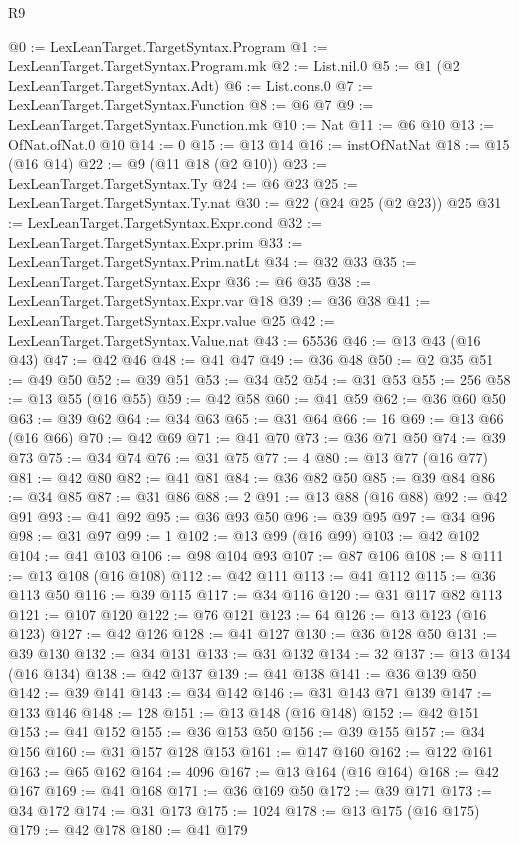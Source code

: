 \begin{lexlean}{R9}
\begin{coremodule}
@0 := LexLeanTarget.TargetSyntax.Program
@1 := LexLeanTarget.TargetSyntax.Program.mk
@2 := List.nil.{0}
@5 := @1 (@2 LexLeanTarget.TargetSyntax.Adt)
@6 := List.cons.{0}
@7 := LexLeanTarget.TargetSyntax.Function
@8 := @6 @7
@9 := LexLeanTarget.TargetSyntax.Function.mk
@10 := Nat
@11 := @6 @10
@13 := OfNat.ofNat.{0} @10
@14 := 0
@15 := @13 @14
@16 := instOfNatNat
@18 := @15 (@16 @14)
@22 := @9 (@11 @18 (@2 @10))
@23 := LexLeanTarget.TargetSyntax.Ty
@24 := @6 @23
@25 := LexLeanTarget.TargetSyntax.Ty.nat
@30 := @22 (@24 @25 (@2 @23)) @25
@31 := LexLeanTarget.TargetSyntax.Expr.cond
@32 := LexLeanTarget.TargetSyntax.Expr.prim
@33 := LexLeanTarget.TargetSyntax.Prim.natLt
@34 := @32 @33
@35 := LexLeanTarget.TargetSyntax.Expr
@36 := @6 @35
@38 := LexLeanTarget.TargetSyntax.Expr.var @18
@39 := @36 @38
@41 := LexLeanTarget.TargetSyntax.Expr.value @25
@42 := LexLeanTarget.TargetSyntax.Value.nat
@43 := 65536
@46 := @13 @43 (@16 @43)
@47 := @42 @46
@48 := @41 @47
@49 := @36 @48
@50 := @2 @35
@51 := @49 @50
@52 := @39 @51
@53 := @34 @52
@54 := @31 @53
@55 := 256
@58 := @13 @55 (@16 @55)
@59 := @42 @58
@60 := @41 @59
@62 := @36 @60 @50
@63 := @39 @62
@64 := @34 @63
@65 := @31 @64
@66 := 16
@69 := @13 @66 (@16 @66)
@70 := @42 @69
@71 := @41 @70
@73 := @36 @71 @50
@74 := @39 @73
@75 := @34 @74
@76 := @31 @75
@77 := 4
@80 := @13 @77 (@16 @77)
@81 := @42 @80
@82 := @41 @81
@84 := @36 @82 @50
@85 := @39 @84
@86 := @34 @85
@87 := @31 @86
@88 := 2
@91 := @13 @88 (@16 @88)
@92 := @42 @91
@93 := @41 @92
@95 := @36 @93 @50
@96 := @39 @95
@97 := @34 @96
@98 := @31 @97
@99 := 1
@102 := @13 @99 (@16 @99)
@103 := @42 @102
@104 := @41 @103
@106 := @98 @104 @93
@107 := @87 @106
@108 := 8
@111 := @13 @108 (@16 @108)
@112 := @42 @111
@113 := @41 @112
@115 := @36 @113 @50
@116 := @39 @115
@117 := @34 @116
@120 := @31 @117 @82 @113
@121 := @107 @120
@122 := @76 @121
@123 := 64
@126 := @13 @123 (@16 @123)
@127 := @42 @126
@128 := @41 @127
@130 := @36 @128 @50
@131 := @39 @130
@132 := @34 @131
@133 := @31 @132
@134 := 32
@137 := @13 @134 (@16 @134)
@138 := @42 @137
@139 := @41 @138
@141 := @36 @139 @50
@142 := @39 @141
@143 := @34 @142
@146 := @31 @143 @71 @139
@147 := @133 @146
@148 := 128
@151 := @13 @148 (@16 @148)
@152 := @42 @151
@153 := @41 @152
@155 := @36 @153 @50
@156 := @39 @155
@157 := @34 @156
@160 := @31 @157 @128 @153
@161 := @147 @160
@162 := @122 @161
@163 := @65 @162
@164 := 4096
@167 := @13 @164 (@16 @164)
@168 := @42 @167
@169 := @41 @168
@171 := @36 @169 @50
@172 := @39 @171
@173 := @34 @172
@174 := @31 @173
@175 := 1024
@178 := @13 @175 (@16 @175)
@179 := @42 @178
@180 := @41 @179

\end{coremodule}
\end{lexlean}
